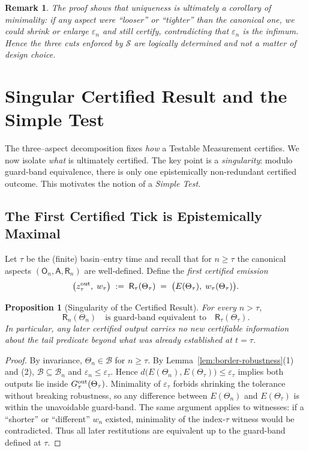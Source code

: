 \documentclass[12pt]{article}
\newtheorem{remark}{Remark}[section]
\newtheorem{proposition}{Proposition}[section]
\begin{document}
\begin{remark}
The proof shows that uniqueness is ultimately a corollary of \emph{minimality}: if any aspect were “looser” or “tighter” than the canonical one, we could shrink or enlarge $\varepsilon_n$ and still certify, contradicting that $\varepsilon_n$ is the infimum.  Hence the three cuts enforced by $\mathcal S$ are logically determined and not a matter of design choice.
\end{remark}

\section{Singular Certified Result and the Simple Test}
\label{sec:singular-result-simple-test}

The three–aspect decomposition fixes \emph{how} a Testable Measurement certifies.  We now isolate \emph{what} is ultimately certified.  The key point is a \emph{singularity}: modulo guard‑band equivalence, there is only one epistemically non‑redundant certified outcome.  This motivates the notion of a \emph{Simple Test}.

\subsection*{The First Certified Tick is Epistemically Maximal}

Let $\tau$ be the (finite) basin–entry time and recall that for $n\ge\tau$ the canonical aspects $(\mathsf O_n,\mathsf A,\mathsf R_n)$ are well‑defined.  Define the \emph{first certified emission}
\[
  \bigl(z^{\rm out}_\tau,\; w_\tau\bigr)
  \;:=\; \mathsf R_\tau(\Theta_\tau)
  \;=\;\bigl(E(\Theta_\tau),\;w_\tau(\Theta_\tau)\bigr).
\]

\begin{proposition}[Singularity of the Certified Result]
\label{prop:singularity}
For every $n>\tau$,
\[
  \mathsf R_n(\Theta_n)
  \quad\text{is guard-band equivalent to}\quad
  \mathsf R_\tau(\Theta_\tau).
\]
In particular, any later certified output carries no new certifiable information about the tail predicate beyond what was already established at $t=\tau$.
\end{proposition}

\begin{proof}
By invariance, $\Theta_n\in\mathcal B$ for $n\ge\tau$.  By Lemma~\ref{lem:border-robustness}(1) and (2), $\mathcal B\subseteq\mathcal B_n$ and $\varepsilon_n\le\varepsilon_\tau$.  Hence $d\bigl(E(\Theta_n),E(\Theta_\tau)\bigr)\le\varepsilon_\tau$ implies both outputs lie inside $G^{\rm out}_\tau(\Theta_\tau)$.  Minimality of $\varepsilon_\tau$ forbids shrinking the tolerance without breaking robustness, so any difference between $E(\Theta_n)$ and $E(\Theta_\tau)$ is within the unavoidable guard-band.  The same argument applies to witnesses: if a “shorter” or “different” $w_n$ existed, minimality of the index‑$\tau$ witness would be contradicted.  Thus all later restitutions are equivalent up to the guard-band defined at $\tau$.
\end{proof}
\end{document}

